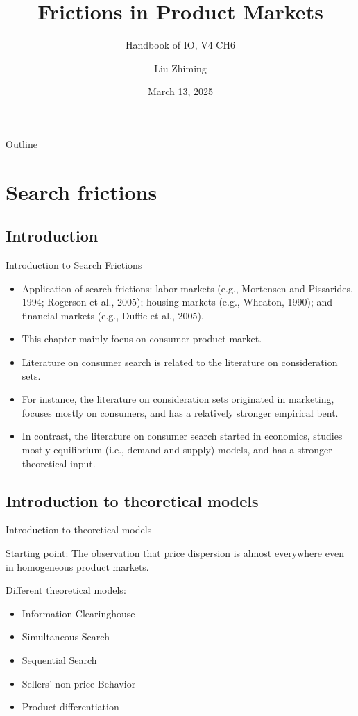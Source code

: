 \documentclass[aspectratio=169]{beamer}  %
\title{Frictions in Product Markets}
\subtitle{Handbook of IO, V4 CH6}
\author{Liu Zhiming}
\institute{Hong Kong University of Science and Technology}
\date{March 13, 2025}
\begin{document}
\begin{frame}
    \titlepage
\end{frame}

\begin{frame}{Outline}
    \tableofcontents
\end{frame}

\section{Search frictions}
\subsection{Introduction}
\begin{frame}{Introduction to Search Frictions}
    \begin{itemize}
        \item Application of search frictions: labor markets (e.g., Mortensen and Pissarides, 1994; Rogerson et al., 2005); housing markets (e.g., Wheaton, 1990); and financial markets (e.g., Duffie et al., 2005).
        \item This chapter mainly focus on consumer product market.
        \item Literature on consumer search is related to the literature on consideration sets.
        \item For instance, the literature on consideration sets originated in marketing, focuses mostly on consumers, and has a relatively stronger empirical bent.
        \item In contrast, the literature on consumer search started in economics, studies mostly equilibrium (i.e., demand and supply) models, and has a stronger theoretical input.
    \end{itemize}
\end{frame}


\subsection{Introduction to theoretical models}
\begin{frame}{Introduction to theoretical models}
    \begin{block}{Starting point:}
        The observation that price dispersion is almost everywhere even in homogeneous product markets.
    \end{block}
    Different theoretical models:
    \begin{itemize}
        \item Information Clearinghouse
        \item Simultaneous Search
        \item Sequential Search
        \item Sellers’ non-price Behavior
        \item Product differentiation
    \end{itemize}
\end{frame}
\end{document}

